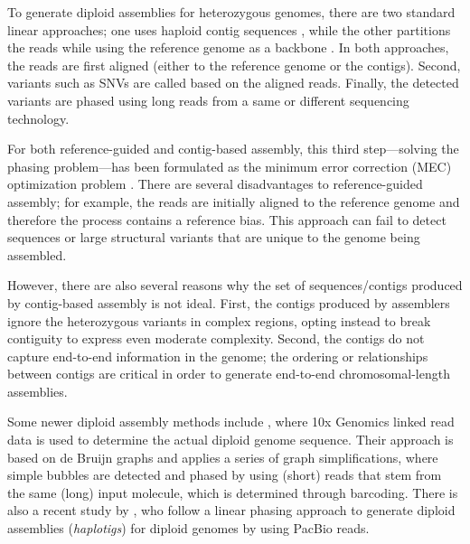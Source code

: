 To generate diploid assemblies for heterozygous genomes, there are two standard linear approaches; one uses haploid contig sequences \citep{chin2016phased, pendleton2015assembly, seo2016novo, mostovoy2016hybrid}, while the other partitions the reads while using the reference genome as a backbone \citep{glusman2014whole, martin2016whatshap, chaisson2017multi}.
In both approaches, the reads are first aligned (either to the reference genome or the contigs). Second, variants such as SNVs are called based on the aligned reads. Finally, the detected variants are phased using long reads from a same or different sequencing technology.

For both reference-guided and contig-based assembly, this third step---solving the phasing problem---has been formulated as the minimum error correction (MEC) optimization problem \citep{Lippert:2002ba,cilibrasi2007complexity}.
There are several disadvantages to reference-guided assembly; for example, the reads are initially aligned to the reference genome and therefore the process contains a reference bias. This approach can fail to detect sequences or large structural variants that are unique to the genome being assembled.

However, there are also several reasons why the set of sequences/contigs produced by contig-based assembly is not ideal.
First, the contigs produced by assemblers ignore the heterozygous variants in complex regions, opting instead to break contiguity to express even moderate complexity. 
Second, the contigs do not capture end-to-end information in the genome; the ordering or relationships between contigs are critical in order to generate end-to-end chromosomal-length assemblies.

Some newer diploid assembly methods include \cite{weisenfeld2017direct}, where 10x Genomics linked read data is used to determine the actual diploid genome sequence. 
Their approach is based on de Bruijn graphs and applies a series of graph simplifications, where simple bubbles are detected and phased by using (short) reads that stem from the same (long) input molecule, which is determined through barcoding.
There is also a recent study by \cite{chin2016phased}, who follow a linear phasing approach to generate diploid assemblies (\textit{haplotigs}) for diploid genomes by using PacBio reads.

